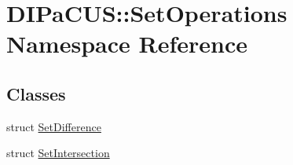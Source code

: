 \hypertarget{namespaceDIPaCUS_1_1SetOperations}{}\section{D\+I\+Pa\+C\+US\+:\+:Set\+Operations Namespace Reference}
\label{namespaceDIPaCUS_1_1SetOperations}
\subsection*{Classes}
\begin{DoxyCompactItemize}
\item 
struct \mbox{\hyperlink{structDIPaCUS_1_1SetOperations_1_1SetDifference}{Set\+Difference}}
\item 
struct \mbox{\hyperlink{structDIPaCUS_1_1SetOperations_1_1SetIntersection}{Set\+Intersection}}
\end{DoxyCompactItemize}
